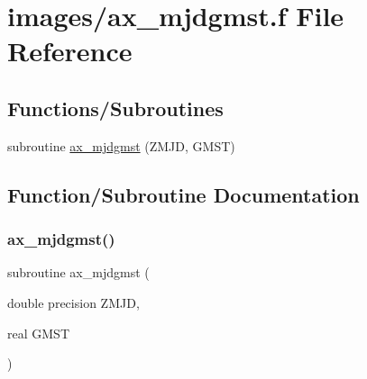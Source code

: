 \hypertarget{ax__mjdgmst_8f}{}\section{images/ax\+\_\+mjdgmst.f File Reference}
\label{ax__mjdgmst_8f}
\subsection*{Functions/\+Subroutines}
\begin{DoxyCompactItemize}
\item 
subroutine \hyperlink{ax__mjdgmst_8f_a61503c1d3623253016d7ed8b3a1facd8}{ax\+\_\+mjdgmst} (Z\+M\+JD, G\+M\+ST)
\end{DoxyCompactItemize}


\subsection{Function/\+Subroutine Documentation}
\mbox{\label{ax__mjdgmst_8f_a61503c1d3623253016d7ed8b3a1facd8}} 
\subsubsection{\texorpdfstring{ax\+\_\+mjdgmst()}{ax\_mjdgmst()}}
{\footnotesize\ttfamily subroutine ax\+\_\+mjdgmst (\begin{DoxyParamCaption}\item[{double precision}]{Z\+M\+JD,  }\item[{real}]{G\+M\+ST }\end{DoxyParamCaption})}

